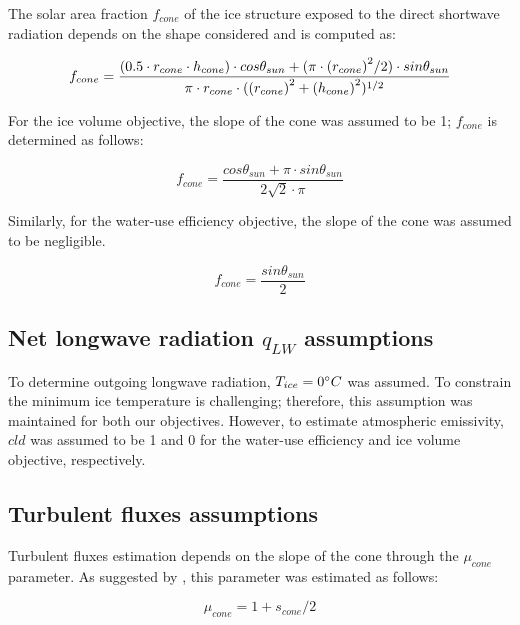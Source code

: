 \documentclass[tc, manuscript]{copernicus}
\begin{document}
The solar area fraction $f_{cone}$ of the ice structure exposed to the direct shortwave radiation depends on the
shape considered and is computed as:

\begin{equation}
		f_{cone} =\frac{(0.5 \cdot r_{cone} \cdot h_{cone}) \cdot cos \theta_{sun} +(\pi \cdot
			{(r_{cone})}^2/2) \cdot sin \theta_{sun} }{\pi \cdot r_{cone} \cdot ({(r_{cone})}^2+{(h_{cone})}^2)^{1/2}}\\
\end{equation}

For the ice volume objective, the slope of the cone was assumed to be 1; $f_{cone}$ is determined as follows:

\begin{equation}
		f_{cone} =\frac{ cos \theta_{sun} + \pi \cdot sin \theta_{sun} }{2\sqrt{2} \cdot \pi }
\end{equation}

Similarly, for the water-use efficiency objective, the slope of the cone was assumed to be negligible.

\begin{equation}
		f_{cone} =\frac{ sin \theta_{sun} }{2 }
\end{equation}

\subsection{Net longwave radiation \texorpdfstring{$q_{LW}$}{Lg} assumptions} 
\label{sec:LW}

To determine outgoing longwave radiation, $T_{ice} = 0 ^{\circ} C$ was assumed. To constrain the minimum ice
temperature is challenging; therefore, this assumption was maintained for both our objectives. However, to
estimate atmospheric emissivity, $cld$ was assumed to be 1 and 0 for the water-use efficiency and ice volume
objective, respectively.

\subsection{Turbulent fluxes assumptions} \label{sec:Qs}

Turbulent fluxes estimation depends on the slope of the cone through the $\mu_{cone}$ parameter. As suggested 
by \citet{oerlemansBriefCommunicationGrowth2021}, this parameter was estimated as follows:

\begin{equation}
  \mu_{cone} =1 + s_{cone}/2
\end{equation}
\end{document}
